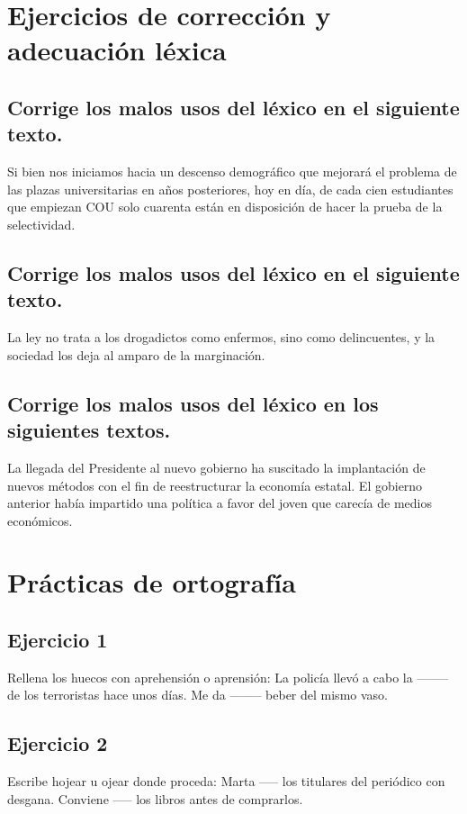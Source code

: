 \documentclass[12pt, a4paper, oneside]{report}
\begin{document}
\chapter{Ejercicios de corrección y adecuación léxica}
\section{Corrige los malos usos
del léxico en el siguiente texto.}
Si bien nos iniciamos hacia un descenso %
demográﬁco que mejorará el problema de
las
plazas
universitarias
en
años
posteriores, hoy en día, de cada cien
estudiantes que empiezan COU solo
cuarenta están en disposición de hacer la
prueba de la selectividad.

\section{Corrige los malos usos
del léxico en el siguiente texto.}
La ley no trata a los drogadictos como
enfermos, sino como delincuentes, y la
sociedad los deja al amparo de la
marginación.

\section{Corrige los malos usos
del léxico en los siguientes textos.}
La llegada del Presidente %
 al nuevo gobierno ha suscitado %
  la implantación de nuevos métodos con el ﬁn de reestructurar
la economía estatal.
El gobierno anterior había impartido una %
política a favor del joven %
que carecía de medios económicos.

\chapter{Prácticas de ortografía}
\section{Ejercicio 1}
Rellena los huecos con
aprehensión o aprensión:
La policía llevó a cabo la --------
de los terroristas hace unos días.
Me da -------- beber del mismo
vaso.

\section{Ejercicio 2}
Escribe hojear u ojear donde
proceda:
Marta ----- los titulares del
periódico con desgana.
Conviene ----- los libros antes de
comprarlos.
\end{document}
